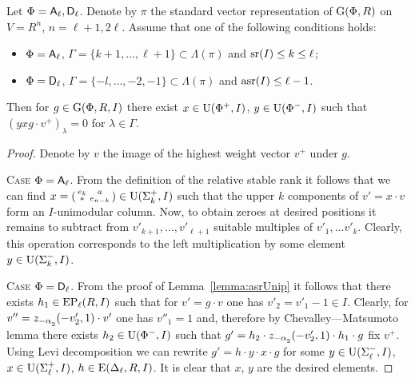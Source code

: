 \begin{lemma} \label{lemma:uraction} 
Let $\Phi=\mathsf{A}_\ell, \mathsf{D}_\ell$. Denote by $\pi$ the standard vector representation of $\operatorname{G}(\Phi, R)$ on $V=R^n$, $n=\ell+1,2\ell$.
Assume that one of the following conditions holds:
\begin{itemize}
 \item $\Phi=\mathsf{A}_\ell$, $\Gamma=\{ k+1, \ldots, \ell+1\} \subset \Lambda(\pi)$ and $\operatorname{sr}(I)\leq k\leq \ell$;
 \item $\Phi=\mathsf{D}_\ell$, $\Gamma=\{-l,\ldots, -2, -1\} \subset \Lambda(\pi)$ and $\operatorname{asr}(I)\leq \ell-1$. 
\end{itemize}
Then for $g\in \operatorname{G}(\Phi, R, I)$ there exist $x\in \operatorname{U}(\Phi^+, I)$, $y\in \operatorname{U}(\Phi^-, I)$ such that $(yxg \cdot v^+)_\lambda = 0$ for $\lambda\in \Gamma$.
\end{lemma}
\begin{proof} Denote by $v$ the image of the highest weight vector $v^+$ under $g$.

\textsc{Case $\Phi=\mathsf{A}_\ell$.} From the definition of the relative stable rank it follows that we can find 
$x= \left(\begin{smallmatrix} e_k & a \\ * & e_{n-k} \end{smallmatrix}\right) \in \operatorname{U}(\Sigma_k^+, I)$ such that 
the upper $k$ components of $v'= x \cdot v$ form an $I$-unimodular column. 
Now, to obtain zeroes at desired positions it remains to subtract from $v'_{k+1},\ldots, v'_{\ell+1}$ suitable multiples of $v'_1,\ldots v'_k$.
Clearly, this operation corresponds to the left multiplication by some element $y\in\operatorname{U}(\Sigma_k^-, I)$.

\textsc{Case $\Phi=\mathsf{D}_\ell$.} From the proof of Lemma~\ref{lemma:asrUnip} it follows that there exists $h_1 \in \operatorname{EP}_\ell(R, I)$ such that for $v'=g\cdot v$ one has $v'_2=v'_1-1\in I$.
Clearly, for $v'' = z_{-\alpha\ssub{2}}(-v'_2, 1)\cdot v'$ one has $v''_1=1$ and, therefore by Chevalley---Matsumoto lemma there exists $h_2 \in \operatorname{U}(\Phi^-, I)$ such that 
$g'=h_2 \cdot z_{-\alpha\ssub{2}}(-v'_2, 1) \cdot h_1 \cdot g$ fix $v^+$. Using Levi decomposition we can rewrite $g'=h \cdot y \cdot x \cdot g$ for some $y\in\operatorname{U}(\Sigma^-_\ell, I)$, $x \in \operatorname{U}(\Sigma^+_\ell, I)$, $h\in\operatorname{E}(\Delta_\ell, R, I)$.
It is clear that $x$, $y$ are the desired elements.
\end{proof}